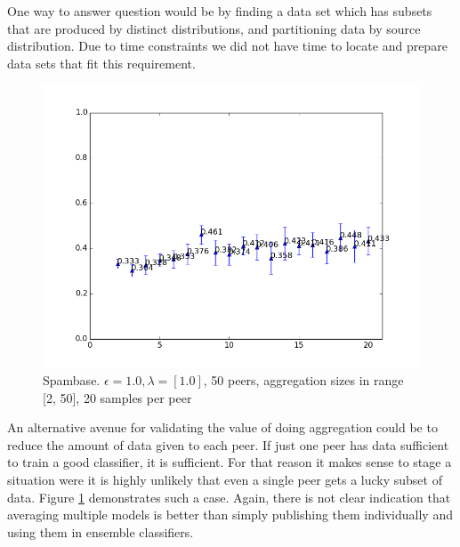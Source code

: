 One way to answer question would be by finding a data set which has subsets that are produced by distinct distributions, and partitioning data by source distribution. Due to time constraints we did not have time to locate and prepare data sets that fit this requirement. 

\begin{figure}[h!]
	\centering
	\includegraphics[width=\textwidth]{fig/spambase/ShowingPotentialUsefulnessOfLargerGroups-eps1.0,budg=eps,peers50,groups2-20,reg2e-2-dataMax20-pubAll-LRbyCV-retuning}
	\caption{Spambase. $\epsilon = 1.0, \lambda = [1.0]$, 50 peers, aggregation sizes in range [2, 50], 20 samples per peer}
	\label{fig:groupsize_limiteddata}
\end{figure}


An alternative avenue for validating the value of doing aggregation could be to reduce the amount of data given to each peer. If just one peer has data sufficient to train a good classifier, it is sufficient. For that reason it makes sense to stage a situation were it is highly unlikely that even a single peer gets a lucky subset of data. Figure \ref{fig:groupsize_limiteddata} demonstrates such a case. Again, there is not clear indication that averaging multiple models is better than simply publishing them individually and using them in ensemble classifiers.


